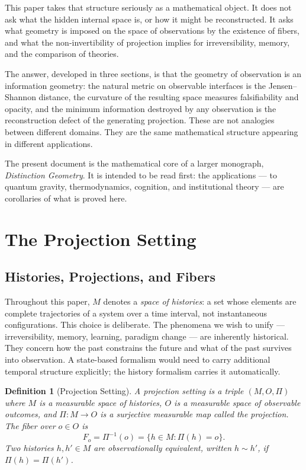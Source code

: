 \documentclass[12pt,a4paper]{article}
\newtheorem{definition}[theorem]{Definition}
\theoremstyle{remark}
\theoremstyle{definition}
\begin{document}
This paper takes that structure seriously as a mathematical object. It
does not ask what the hidden internal space is, or how it might be
reconstructed. It asks what geometry is imposed on the space of
observations by the existence of fibers, and what the non-invertibility
of projection implies for irreversibility, memory, and the comparison of
theories.

The answer, developed in three sections, is that the geometry of
observation is an information geometry: the natural metric on observable
interfaces is the Jensen--Shannon distance, the curvature of the resulting
space measures falsifiability and opacity, and the minimum information
destroyed by any observation is the reconstruction defect of the generating
projection. These are not analogies between different domains. They are
the same mathematical structure appearing in different applications.

The present document is the mathematical core of a larger monograph,
\emph{Distinction Geometry}. It is intended to be read first: the
applications --- to quantum gravity, thermodynamics, cognition, and
institutional theory --- are corollaries of what is proved here.


\section{The Projection Setting}

\subsection{Histories, Projections, and Fibers}

Throughout this paper, $M$ denotes a \emph{space of histories}: a set
whose elements are complete trajectories of a system over a time interval,
not instantaneous configurations. This choice is deliberate. The phenomena
we wish to unify --- irreversibility, memory, learning, paradigm change ---
are inherently historical. They concern how the past constrains the future
and what of the past survives into observation. A state-based formalism
would need to carry additional temporal structure explicitly; the history
formalism carries it automatically.

\begin{definition}[Projection Setting]
A \emph{projection setting} is a triple $(M, O, \Pi)$ where $M$ is a
measurable space of histories, $O$ is a measurable space of observable
outcomes, and $\Pi : M \to O$ is a surjective measurable map called the
\emph{projection}. The \emph{fiber} over $o \in O$ is
\begin{equation}
  F_o = \Pi^{-1}(o) = \{h \in M : \Pi(h) = o\}.
\end{equation}
Two histories $h, h' \in M$ are \emph{observationally equivalent},
written $h \sim h'$, if $\Pi(h) = \Pi(h')$.
\end{definition}
\end{document}
